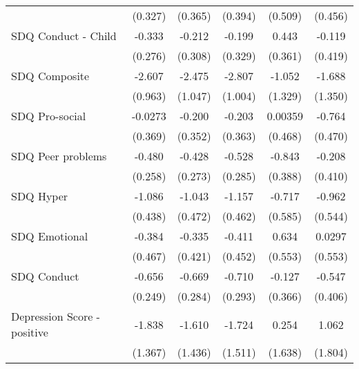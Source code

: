 {\begin{tabular}{l*{5}{c}}
            &     (0.327)         &     (0.365)         &     (0.394)         &     (0.509)         &     (0.456)         \\
\addlinespace
SDQ Conduct - Child&      -0.333         &      -0.212         &      -0.199         &       0.443         &      -0.119         \\
            &     (0.276)         &     (0.308)         &     (0.329)         &     (0.361)         &     (0.419)         \\
\addlinespace
SDQ Composite&      -2.607\sym{**} &      -2.475\sym{*}  &      -2.807\sym{**} &      -1.052         &      -1.688         \\
            &     (0.963)         &     (1.047)         &     (1.004)         &     (1.329)         &     (1.350)         \\
\addlinespace
SDQ Pro-social&     -0.0273         &      -0.200         &      -0.203         &     0.00359         &      -0.764         \\
            &     (0.369)         &     (0.352)         &     (0.363)         &     (0.468)         &     (0.470)         \\
\addlinespace
SDQ Peer problems&      -0.480         &      -0.428         &      -0.528         &      -0.843\sym{*}  &      -0.208         \\
            &     (0.258)         &     (0.273)         &     (0.285)         &     (0.388)         &     (0.410)         \\
\addlinespace
SDQ Hyper   &      -1.086\sym{*}  &      -1.043\sym{*}  &      -1.157\sym{*}  &      -0.717         &      -0.962         \\
            &     (0.438)         &     (0.472)         &     (0.462)         &     (0.585)         &     (0.544)         \\
\addlinespace
SDQ Emotional&      -0.384         &      -0.335         &      -0.411         &       0.634         &      0.0297         \\
            &     (0.467)         &     (0.421)         &     (0.452)         &     (0.553)         &     (0.553)         \\
\addlinespace
SDQ Conduct &      -0.656\sym{**} &      -0.669\sym{*}  &      -0.710\sym{*}  &      -0.127         &      -0.547         \\
            &     (0.249)         &     (0.284)         &     (0.293)         &     (0.366)         &     (0.406)         \\
\addlinespace
Depression Score - positive&      -1.838         &      -1.610         &      -1.724         &       0.254         &       1.062         \\
            &     (1.367)         &     (1.436)         &     (1.511)         &     (1.638)         &     (1.804)         \\
\bottomrule
\end{tabular}
}
